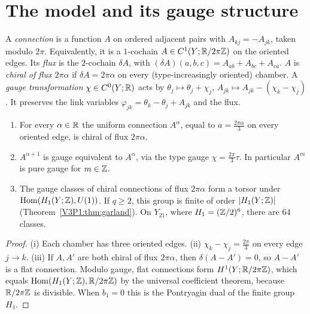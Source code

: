 \section{The model and its gauge structure}\label{V3P3:sec:model}

\begin{definition}\label{V3P3:def:conn}
A \emph{connection} is a function $A$ on ordered adjacent pairs with $A_{kj}=-A_{jk}$, taken
modulo $2\pi$. Equivalently, it is a $1$-cochain $A\in C^{1}(Y;\mathbb{R}/2\pi\mathbb{Z})$ on the oriented
edges. Its \emph{flux} is the $2$-cochain $\delta A$, with
$(\delta A)(a,b,c)=A_{ab}+A_{bc}+A_{ca}$. $A$ is \emph{chiral of flux $2\pi\alpha$} if
$\delta A=2\pi\alpha$ on every (type-increasingly oriented) chamber. A \emph{gauge
transformation} $\chi\in C^{0}(Y;\mathbb{R})$ acts by $\theta_j\mapsto\theta_j+\chi_j$,
$A_{jk}\mapsto A_{jk}-(\chi_k-\chi_j)$. It preserves the link variables
$\varphi_{jk}=\theta_k-\theta_j+A_{jk}$ and the flux.
\end{definition}

\begin{proposition}\label{V3P3:prop:chiral}
\begin{enumerate}
\item[(i)] For every $\alpha\in\mathbb{R}$ the uniform connection $A^{\alpha}$, equal to
$a=\frac{2\pi\alpha}{3}$ on every oriented edge, is chiral of flux $2\pi\alpha$.
\item[(ii)] $A^{\alpha+1}$ is gauge equivalent to $A^{\alpha}$, via the type gauge
$\chi=\frac{2\pi}{3}\tau$. In particular $A^{m}$ is pure gauge for $m\in\mathbb{Z}$.
\item[(iii)] The gauge classes of chiral connections of flux $2\pi\alpha$ form a torsor under
$\operatorname{Hom}(H_1(Y;\mathbb{Z}),U(1))$. If $q\ge2$, this group is finite of order $|H_1(Y;\mathbb{Z})|$
(Theorem~\ref{V3P1:thm:garland}). On $Y_{21}$, where $H_1=(\mathbb{Z}/2)^{6}$, there are $64$ classes.
\end{enumerate}
\end{proposition}

\begin{proof}
(i) Each chamber has three oriented edges. (ii) $\chi_k-\chi_j=\frac{2\pi}{3}$ on every edge
$j\to k$. (iii) If $A,A'$ are both chiral of flux $2\pi\alpha$, then $\delta(A-A')=0$, so
$A-A'$ is a flat connection. Modulo gauge, flat connections form $H^{1}(Y;\mathbb{R}/2\pi\mathbb{Z})$, which
equals $\operatorname{Hom}(H_1(Y;\mathbb{Z}),\mathbb{R}/2\pi\mathbb{Z})$ by the universal coefficient theorem, because $\mathbb{R}/2\pi\mathbb{Z}$ is
divisible. When $b_1=0$ this is the Pontryagin dual of the finite group $H_1$.
\end{proof}

